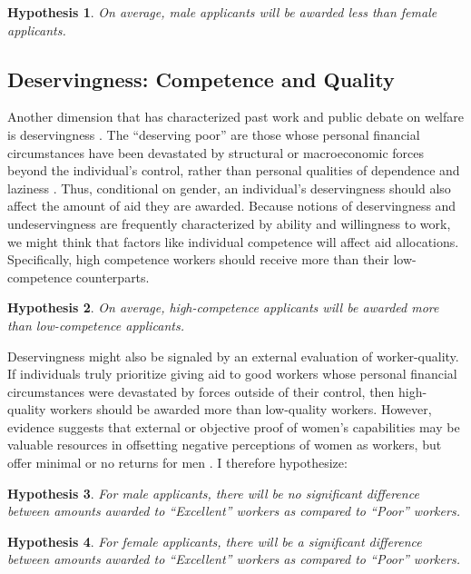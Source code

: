 \documentclass[12pt]{article}%
\newtheorem{hypothesis}{Hypothesis}
\begin{document}
\begin{doublespace}
\begin{hypothesis} \label{hyp:first}
	On average, male applicants will be awarded less than female applicants.
\end{hypothesis}

\subsection*{Deservingness: Competence and Quality}
Another dimension that has characterized past work and public debate on welfare is deservingness \citep{schneider_social_1993}. The ``deserving poor” are those whose personal financial circumstances have been devastated by structural or macroeconomic forces beyond the individual’s control, rather than personal qualities of dependence and laziness \citep{van_oorschot_who_nodate}. Thus, conditional on gender, an individual’s deservingness should also affect the amount of aid they are awarded. Because notions of deservingness and undeservingness are frequently characterized by ability and willingness to work, we might think that factors like individual competence will affect aid allocations. Specifically, high competence workers should receive more than their low-competence counterparts.


\begin{hypothesis} \label{hyp:second}
On average, high-competence applicants will be awarded more than low-competence applicants.
\end{hypothesis}


Deservingness might also be signaled by an external evaluation of worker-quality. If individuals truly prioritize giving aid to good workers whose personal financial circumstances were devastated by forces outside of their control, then high-quality workers should be awarded more than low-quality workers. However, evidence suggests that external or objective proof of women’s capabilities may be valuable resources in offsetting negative perceptions of women as workers, but offer minimal or no returns for men \citep{abel_value_2020, dadgar_labor_2015, jepsen_labor-market_2014}. I therefore hypothesize:


\begin{hypothesis} \label{hyp:thirda}
	For male applicants, there will be no significant difference between amounts awarded to ``Excellent” workers as compared to ``Poor” workers.
\end{hypothesis}

\begin{hypothesis} \label{hyp:thirdb}
	For female applicants, there will be a significant difference between amounts awarded to ``Excellent” workers as compared to ``Poor” workers.
\end{hypothesis}



\end{doublespace}
\end{document}
